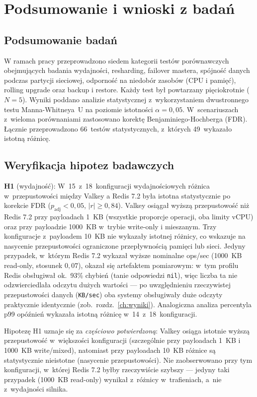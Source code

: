 \chapter{Podsumowanie i wnioski z badań}\label{ch:podsumowanie}

\section{Podsumowanie badań}

W ramach pracy przeprowadzono siedem kategorii testów porównawczych obejmujących badania wydajności, resharding, failover mastera, spójność danych podczas partycji sieciowej, odporność na niedobór zasobów (CPU i pamięć), rolling upgrade oraz backup i restore. Każdy test był powtarzany pięciokrotnie ($N = 5$). Wyniki poddano analizie statystycznej z~wykorzystaniem dwustronnego testu Manna-Whitneya~U na poziomie istotności $\alpha = 0{,}05$. W~scenariuszach z~wieloma porównaniami zastosowano korektę Benjaminiego-Hochberga (FDR). Łącznie przeprowadzono 66~testów statystycznych, z~których 49~wykazało istotną różnicę.

\section{Weryfikacja hipotez badawczych}

\textbf{H1} (wydajność): W~15~z~18~konfiguracji wydajnościowych różnica w~przepustowości między Valkey a Redis 7.2 była istotna statystycznie po korekcie FDR ($p_{\mathrm{adj}} < 0{,}05$, $|r| \geq 0{,}84$). Valkey osiągał wyższą przepustowość niż Redis 7.2 przy payloadach 1~KB (wszystkie proporcje operacji, oba limity vCPU) oraz przy payloadzie 1000~KB w~trybie write-only i mieszanym. Trzy konfiguracje z~payloadem 10~KB nie wykazały istotnej różnicy, co wskazuje na nasycenie przepustowości ograniczone przepływnością pamięci lub sieci. Jedyny przypadek, w~którym Redis 7.2 wykazał wyższe nominalne ops/sec (1000~KB read-only, stosunek $0{,}07$), okazał się artefaktem pomiarowym: w~tym profilu Redis obsługiwał ok.\ 93\% chybień (tanie odpowiedzi \texttt{nil}), więc liczba ta nie odzwierciedlała odczytu dużych wartości --- po uwzględnieniu rzeczywistej przepustowości danych (\texttt{KB/sec}) oba systemy obsługiwały duże odczyty praktycznie identycznie (zob.\ rozdz.~\ref{ch:wyniki}). Analogiczna analiza percentyla p99 opóźnień wykazała istotną różnicę w~14~z~18~konfiguracji.

Hipotezę H1 uznaje się za \textit{częściowo potwierdzoną}: Valkey osiąga istotnie wyższą przepustowość w~większości konfiguracji (szczególnie przy payloadach 1~KB i 1000~KB write/mixed), natomiast przy payloadach 10~KB różnice są statystycznie nieistotne (nasycenie przepustowości). Nie zaobserwowano przy tym konfiguracji, w~której Redis 7.2 byłby rzeczywiście szybszy --- jedyny taki przypadek (1000~KB read-only) wynikał z~różnicy w~trafieniach, a~nie z~wydajności silnika.

